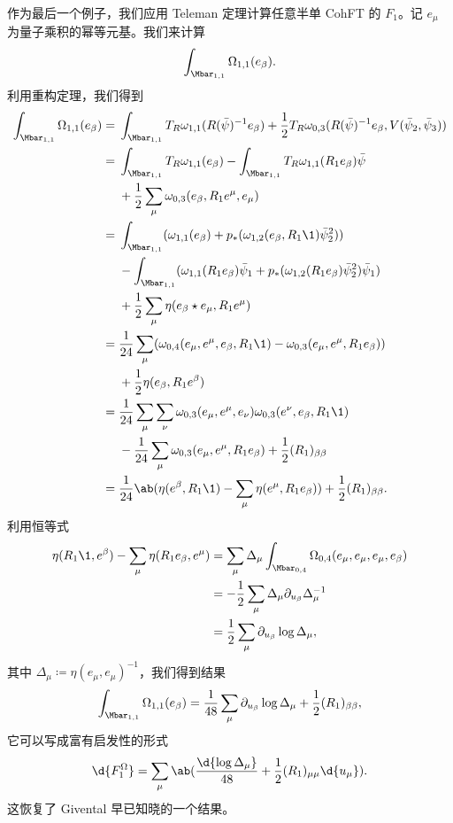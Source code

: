 \begin{exm}
    作为最后一个例子，我们应用 Teleman 定理计算任意半单 CohFT 的 $F_1$。记 $e_{\mu}$ 为量子乘积的幂等元基。我们来计算
    \[ \int_{\Mbar_{1,1}} \Omega_{1,1}(e_{\beta}). \]
    利用重构定理，我们得到
    \begin{align*}
        \int_{\Mbar_{1,1}}\Omega_{1,1}(e_{\beta}) ={}& \int_{\Mbar_{1,1}} T_R \omega_{1,1}(R(\bar{\psi})^{-1} e_{\beta}) + \frac{1}{2} T_R \omega_{0,3}(R(\bar{\psi})^{-1} e_{\beta}, V(\bar{\psi}_2, \bar{\psi}_3)) \\
        ={}& \int_{\Mbar_{1,1}}T_R\omega_{1,1}(e_{\beta}) - \int_{\Mbar_{1,1}} T_R \omega_{1,1}(R_1 e_{\beta})\bar{\psi} \\
        &+ \frac{1}{2}\sum_{\mu}  \omega_{0,3}(e_{\beta}, R_1 e^{\mu}, e_{\mu}) \\
        ={}& \int_{\Mbar_{1,1}} ( \omega_{1,1}(e_{\beta}) + p_* ( \omega_{1,2}(e_{\beta}, R_1 \1) \bar{\psi}_2^2 )) \\
        &- \int_{\Mbar_{1,1}} (\omega_{1,1}(R_1 e_{\beta})\bar{\psi}_1 + p_* ( \omega_{1,2}(R_1 e_{\beta}) \bar{\psi}_2^2 ) \bar{\psi}_1) \\
        &+ \frac{1}{2} \sum_{\mu} \eta(e_{\beta} \star e_{\mu}, R_1 e^{\mu}) \\
        ={}& \frac{1}{24} \sum_{\mu} ( \omega_{0,4}(e_{\mu}, e^{\mu}, e_{\beta}, R_1 \1) -\omega_{0,3}(e_{\mu}, e^{\mu}, R_1 e_{\beta}) )\\
        &+ \frac{1}{2} \eta(e_{\beta}, R_1 e^{\beta}) \\
        ={}& \frac{1}{24} \sum_{\mu}\sum_{\nu} \omega_{0,3}(e_{\mu}, e^{\mu}, e_{\nu})\omega_{0,3}(e^{\nu}, e_{\beta}, R_1 \1) \\
        &-\frac{1}{24} \sum_{\mu} \omega_{0,3}(e_{\mu}, e^{\mu}, R_1 e_{\beta}) + \frac{1}{2} (R_1)_{\beta\beta} \\
        ={}& \frac{1}{24} \ab(\eta(e^{\beta}, R_1 \1) - \sum_{\mu} \eta(e^{\mu}, R_1 e_{\beta})) + \frac{1}{2} (R_1)_{\beta\beta}.
    \end{align*}
    利用恒等式
    \begin{align*}
        \eta(R_1 \1, e^{\beta}) - \sum_{\mu} \eta(R_1 e_{\beta}, e^{\mu}) &= \sum_{\mu} \Delta_{\mu} \int_{\Mbar_{0,4}} \Omega_{0,4}(e_{\mu}, e_{\mu}, e_{\mu}, e_{\beta}) \\
        &= -\frac{1}{2}\sum_{\mu} \Delta_{\mu} \partial_{u_{\beta}} \Delta_{\mu}^{-1} \\
        &= \frac{1}{2} \sum_{\mu} \partial_{u_{\beta}} \log \Delta_{\mu},
    \end{align*}
    其中 $\Delta_{\mu} \coloneqq \eta(e_{\mu}, e_{\mu})^{-1}$，我们得到结果
    \[ \int_{\Mbar_{1,1}} \Omega_{1,1}(e_{\beta}) = \frac{1}{48} \sum_{\mu} \partial_{u_{\beta}} \log \Delta_{\mu} + \frac{1}{2} (R_1)_{\beta\beta}, \]
    它可以写成富有启发性的形式
    \[ \d{F_1^{\Omega}} = \sum_{\mu} \ab( \frac{\d{\log \Delta_{\mu}}}{48} + \frac{1}{2} (R_1)_{\mu\mu} \d{u_{\mu}} ). \]
    这恢复了 Givental 早已知晓的一个结果。
\end{exm}

